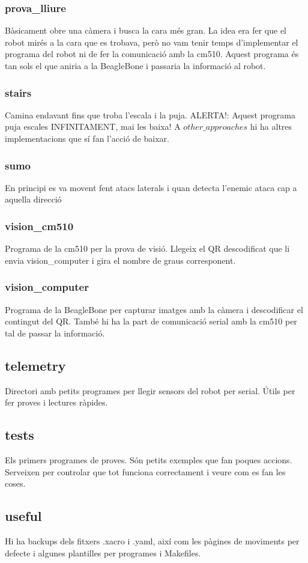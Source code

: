 \documentclass{article}
\begin{document}
\subsubsection{prova\_lliure}
Bàsicament obre una càmera i busca la cara més gran. La idea era fer que el robot mirés a la cara que es trobava, però no vam tenir temps d'implementar el programa del robot ni de fer la comunicació amb la cm510. Aquest programa és tan sols el que aniria a la BeagleBone i passaria la informació al robot.
\subsubsection{stairs}
Camina endavant fins que troba l'escala i la puja. ALERTA!: Aquest programa puja escales INFINITAMENT, mai les baixa! A $other\_approaches$ hi ha altres implementacions que sí fan l'acció de baixar.
\subsubsection{sumo}
En principi es va movent fent atacs laterals i quan detecta l'enemic ataca cap a aquella direcció
\subsubsection{vision\_cm510}
Programa de la cm510 per la prova de visió. Llegeix el QR descodificat que li envia vision\_computer i gira el nombre de graus corresponent.
\subsubsection{vision\_computer}
Programa de la BeagleBone per capturar imatges amb la càmera i descodificar el contingut del QR. També hi ha la part de comunicació serial amb la cm510 per tal de passar la informació.

\subsection{telemetry}
Directori amb petits programes per llegir sensors del robot per serial. Útils per fer proves i lectures ràpides.
\subsection{tests}
Els primers programes de proves. Són petits exemples que fan poques accions. Serveixen per controlar que tot funciona correctament i veure com es fan les coses.
\subsection{useful}
Hi ha backups dels fitxers .xacro i .yaml, així com les pàgines de moviments per defecte i algunes plantilles per programes i Makefiles.
\end{document}
